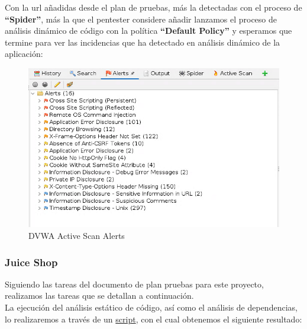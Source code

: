 Con la url añadidas desde el plan de pruebas, más la detectadas con el proceso de \textbf{“Spider”}, más la que el pentester
considere añadir lanzamos el proceso de análisis dinámico de código con  la política \textbf{“Default Policy”} y esperamos
que termine para ver las incidencias que ha detectado en análisis dinámico de la aplicación:

\begin{figure}[!htb]
    \captionsetup{width=1\linewidth}  
    \includegraphics[width=\linewidth]{./imagenes/04_1_2_04_DVWA_ZapProxyActivescanAlerts.png}
    \caption{DVWA Active Scan Alerts}  
    \label{fig:DVWA Active Scan Alerts}
\end{figure}

\clearpage
\newpage

\subsubsection{Juice Shop}
Siguiendo las tareas del documento de plan pruebas para este proyecto, realizamos las tareas que se detallan a continuación.\\

La ejecución del análisis estático de código, así como el análisis de dependencias, lo realizaremos a través de un 
\href{https://github.com/M0l1n3ta/PFG/blob/master/Scripts/STAT/RunSonarScaner_JuiceShop.ps1}{script}, con el cual obtenemos 
el siguiente resultado:\\

